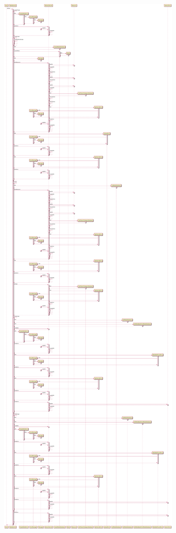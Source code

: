 \includegraphics[width=\textwidth,height=\textheight,keepaspectratio]{Schemas/MediaServlet_doPost.svg.pdf}

